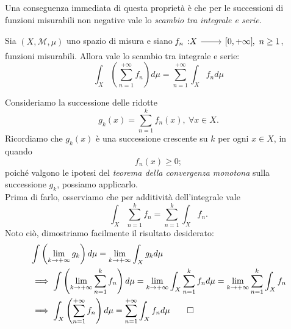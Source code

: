 Una conseguenza immediata di questa proprietà è che per le successioni di funzioni misurabili non negative vale lo \textit{scambio tra integrale e serie}.
\begin{corollary}
Sia $\left(X,\mathcal{M},\mu\right)$ uno spazio di misura e siano $\funz{f_n}{X}{\left[0,+\infty\right]},\ n\geq 1$, funzioni misurabili. Allora vale lo scambio tra integrale e serie:
	\begin{equation}
		\int_X\left(\sum_{n=1}^{+\infty}f_n\right)d\mu=\sum_{n=1}^{+\infty}\int_Xf_nd\mu
	\end{equation}
\end{corollary}
\begin{demonstration}
	Consideriamo la successione delle ridotte
	\begin{equation*}
		g_k(x)=\sum_{n=1}^{k}f_n(x),\ \forall x\in X.
	\end{equation*}
	Ricordiamo che $g_k(x)$ è una successione crescente su $k$ per ogni $x\in X$, in quando
	\begin{equation*}
		f_n(x)\geq 0;
	\end{equation*}
	poiché valgono le ipotesi del \textit{teorema della convergenza monotona} sulla successione $g_k$, possiamo applicarlo.\\
	Prima di farlo, osserviamo che per additività dell'integrale vale
	\begin{equation*}
		\int_X \sum_{n=1}^{k}f_n=\sum_{n=1}^{k}\int_X f_n.
	\end{equation*}
	Noto ciò, dimostriamo facilmente il risultato desiderato: 
	\begin{align*}
		&\int \left(\lim_{k\to+\infty}g_k\right)d\mu=\lim_{k\to+\infty}\int_X g_kd\mu\\
		&\implies \int \left(\lim_{k\to+\infty}\sum_{n=1}^{k}f_n\right)d\mu=\lim_{k\to+\infty}\int_X \sum_{n=1}^{k}f_nd\mu=\lim_{k\to+\infty}\sum_{n=1}^{k}\int_X f_n\\
		&\implies \int_X\left(\sum_{n=1}^{+\infty}f_n\right)d\mu=\sum_{n=1}^{+\infty}\int_Xf_nd\mu\qedhere
	\end{align*}
\end{demonstration}
